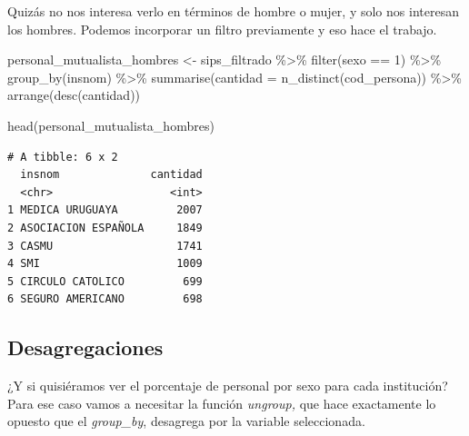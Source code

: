\documentclass[
  letterpaper,
  DIV=11,
  numbers=noendperiod]{scrreprt}
\newenvironment{Shaded}{\begin{snugshade}}{\end{snugshade}}
\newcommand{\AttributeTok}[1]{\textcolor[rgb]{0.40,0.45,0.13}{#1}}
\newcommand{\DecValTok}[1]{\textcolor[rgb]{0.68,0.00,0.00}{#1}}
\newcommand{\FunctionTok}[1]{\textcolor[rgb]{0.28,0.35,0.67}{#1}}
\newcommand{\NormalTok}[1]{\textcolor[rgb]{0.00,0.23,0.31}{#1}}
\newcommand{\OtherTok}[1]{\textcolor[rgb]{0.00,0.23,0.31}{#1}}
\newcommand{\SpecialCharTok}[1]{\textcolor[rgb]{0.37,0.37,0.37}{#1}}
\begin{document}
Quizás no nos interesa verlo en términos de hombre o mujer, y solo nos
interesan los hombres. Podemos incorporar un filtro previamente y eso
hace el trabajo.

\begin{Shaded}
\begin{Highlighting}[]
\NormalTok{personal\_mutualista\_hombres }\OtherTok{\textless{}{-}}\NormalTok{ sips\_filtrado }\SpecialCharTok{\%\textgreater{}\%} 
  \FunctionTok{filter}\NormalTok{(sexo }\SpecialCharTok{==} \DecValTok{1}\NormalTok{) }\SpecialCharTok{\%\textgreater{}\%} 
  \FunctionTok{group\_by}\NormalTok{(insnom) }\SpecialCharTok{\%\textgreater{}\%} 
  \FunctionTok{summarise}\NormalTok{(}\AttributeTok{cantidad =} \FunctionTok{n\_distinct}\NormalTok{(cod\_persona)) }\SpecialCharTok{\%\textgreater{}\%} 
  \FunctionTok{arrange}\NormalTok{(}\FunctionTok{desc}\NormalTok{(cantidad))}

\FunctionTok{head}\NormalTok{(personal\_mutualista\_hombres)}
\end{Highlighting}
\end{Shaded}

\begin{verbatim}
# A tibble: 6 x 2
  insnom              cantidad
  <chr>                  <int>
1 MEDICA URUGUAYA         2007
2 ASOCIACION ESPAÑOLA     1849
3 CASMU                   1741
4 SMI                     1009
5 CIRCULO CATOLICO         699
6 SEGURO AMERICANO         698
\end{verbatim}

\hypertarget{desagregaciones}{%
\subsection{Desagregaciones}\label{desagregaciones}}

¿Y si quisiéramos ver el porcentaje de personal por sexo para cada
institución?Para ese caso vamos a necesitar la función \emph{ungroup,}
que hace exactamente lo opuesto que el \emph{group\_by}, desagrega por
la variable seleccionada.
\end{document}
